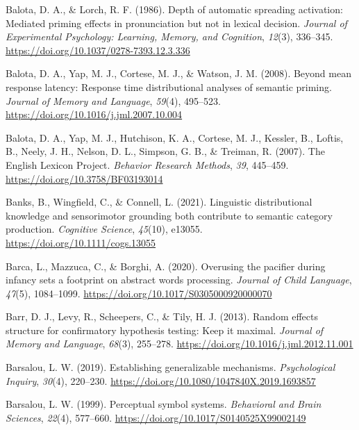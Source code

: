 \documentclass[
  12pt,
  man,floatsintext]{apa7}
\newlength{\cslhangindent}
\newlength{\cslentryspacingunit} %
\newenvironment{CSLReferences}[2] %
 {%
  \setlength{\parindent}{0pt}
  \ifodd #1
  \let\oldpar\par
  \def\par{\hangindent=\cslhangindent\oldpar}
  \fi
  \setlength{\parskip}{#2\cslentryspacingunit}
 }%
 {}
\begin{document}
\begin{CSLReferences}{1}{0}
\leavevmode{}%
Balota, D. A., \& Lorch, R. F. (1986). Depth of automatic spreading activation: {Mediated} priming effects in pronunciation but not in lexical decision. \emph{Journal of Experimental Psychology: Learning, Memory, and Cognition}, \emph{12}(3), 336--345. \url{https://doi.org/10.1037/0278-7393.12.3.336}

\leavevmode{}%
Balota, D. A., Yap, M. J., Cortese, M. J., \& Watson, J. M. (2008). Beyond mean response latency: {Response} time distributional analyses of semantic priming. \emph{Journal of Memory and Language}, \emph{59}(4), 495--523. \url{https://doi.org/10.1016/j.jml.2007.10.004}

\leavevmode{}%
Balota, D. A., Yap, M. J., Hutchison, K. A., Cortese, M. J., Kessler, B., Loftis, B., Neely, J. H., Nelson, D. L., Simpson, G. B., \& Treiman, R. (2007). The {English Lexicon Project}. \emph{Behavior Research Methods}, \emph{39}, 445--459. \url{https://doi.org/10.3758/BF03193014}

\leavevmode{}%
Banks, B., Wingfield, C., \& Connell, L. (2021). Linguistic distributional knowledge and sensorimotor grounding both contribute to semantic category production. \emph{Cognitive Science}, \emph{45}(10), e13055. \url{https://doi.org/10.1111/cogs.13055}

\leavevmode{}%
Barca, L., Mazzuca, C., \& Borghi, A. (2020). Overusing the pacifier during infancy sets a footprint on abstract words processing. \emph{Journal of Child Language}, \emph{47}(5), 1084--1099. \url{https://doi.org/10.1017/S0305000920000070}

\leavevmode{}%
Barr, D. J., Levy, R., Scheepers, C., \& Tily, H. J. (2013). Random effects structure for confirmatory hypothesis testing: {Keep} it maximal. \emph{Journal of Memory and Language}, \emph{68}(3), 255--278. \url{https://doi.org/10.1016/j.jml.2012.11.001}

\leavevmode{}%
Barsalou, L. W. (2019). Establishing generalizable mechanisms. \emph{Psychological Inquiry}, \emph{30}(4), 220--230. \url{https://doi.org/10.1080/1047840X.2019.1693857}

\leavevmode{}%
Barsalou, L. W. (1999). Perceptual symbol systems. \emph{Behavioral and Brain Sciences}, \emph{22}(4), 577--660. \url{https://doi.org/10.1017/S0140525X99002149}


\end{CSLReferences}
\end{document}
